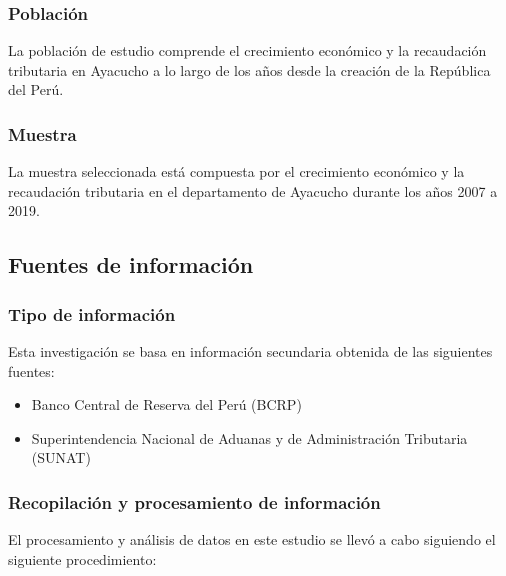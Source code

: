 \documentclass[
  letterpaper,
]{article}
\providecommand{\tightlist}{%
  \setlength{\itemsep}{0pt}\setlength{\parskip}{0pt}}\usepackage{longtable,booktabs,array}
\begin{document}
\hypertarget{poblaciuxf3n}{%
\subsubsection{Población}\label{poblaciuxf3n}}

La población de estudio comprende el crecimiento económico y la
recaudación tributaria en Ayacucho a lo largo de los años desde la
creación de la República del Perú.

\hypertarget{muestra}{%
\subsubsection{Muestra}\label{muestra}}

La muestra seleccionada está compuesta por el crecimiento económico y la
recaudación tributaria en el departamento de Ayacucho durante los años
2007 a 2019.

\hypertarget{fuentes-de-informaciuxf3n}{%
\subsection{Fuentes de información}\label{fuentes-de-informaciuxf3n}}

\hypertarget{tipo-de-informaciuxf3n}{%
\subsubsection{Tipo de información}\label{tipo-de-informaciuxf3n}}

Esta investigación se basa en información secundaria obtenida de las
siguientes fuentes:

\begin{itemize}
\tightlist
\item
  Banco Central de Reserva del Perú (BCRP)
\item
  Superintendencia Nacional de Aduanas y de Administración Tributaria
  (SUNAT)
\end{itemize}

\hypertarget{recopilaciuxf3n-y-procesamiento-de-informaciuxf3n}{%
\subsubsection{Recopilación y procesamiento de
información}\label{recopilaciuxf3n-y-procesamiento-de-informaciuxf3n}}

El procesamiento y análisis de datos en este estudio se llevó a cabo
siguiendo el siguiente procedimiento:
\end{document}
